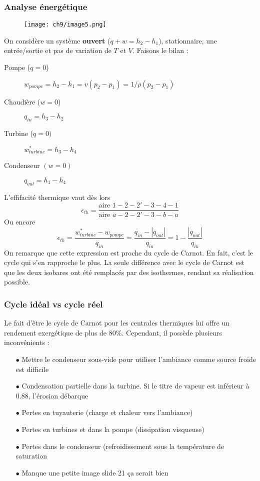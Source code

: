		\subsubsection{Analyse énergétique}
		\begin{wrapfigure}[8]{r}{4cm}
		\vspace{-5mm}
		\texttt{[image: ch9/image5.png]}
		\end{wrapfigure}
		On considère un système \textbf{ouvert} ($q+w = h_2-h_1$), stationnaire, 
		une entrée/sortie et pas de variation de $T$ et $V$. Faisons le bilan :
		\begin{description}
		\item[Pompe ($q=0$)] $w_{pompe} = h_2-h_1 = v(p_2-p_1)=1/\rho(p_2-p_1)$
		\item[Chaudière ($w=0$)] $q_{in} = h_3-h_2$
		\item[Turbine ($q=0)$] $w_{turbine}^* = h_3-h_4$
		\item[Condenseur $(w=0)$] $q_{out} = h_1-h_4$
		\end{description}
		L'effifacité thermique vaut dès lors 
		\begin{equation}
		\epsilon_{th} = \dfrac{\text{aire } 1-2-2'-3-4-1}{\text{aire } a-2-2'-3-b-a}
		\end{equation}
		Ou encore 
		\begin{equation}
		\epsilon_{th} = \dfrac{w_{turbine}^*-w_{pompe}}{q_{in}} = \dfrac{q_{in}-|q_{out}|}{
		q_{in}} = 1-\dfrac{|q_{out}|}{q_{in}}
		\end{equation}
		On remarque que cette expression est proche du cycle de Carnot. En fait, c'est 
		le cycle qui s'en rapproche le plus. La seule différence avec le cycle de Carnot 
		est que les deux isobares ont été remplacés par des isothermes, rendant sa 
		réalisation possible. 
		
		\newpage
		\subsubsection{Cycle idéal vs cycle réel}
		Le fait d’être le cycle de Carnot pour les centrales thermiques lui offre un 
		rendement exergétique de plus de 80\%. Cependant, il possède plusieurs 
		inconvénients :
		\begin{itemize}
		\item[$\bullet$] Mettre le condenseur sous-vide pour utiliser l'ambiance 
		comme source froide est difficile
		\item[$\bullet$] Condensation partielle dans la turbine. Si le titre de 
		vapeur est inférieur à 0.88, l’érosion débarque
		\item[$\bullet$] Pertes en tuyauterie (charge et chaleur vers l'ambiance)
		\item[$\bullet$] Pertes en turbines et dans la pompe (dissipation visqueuse)
		\item[$\bullet$] Pertes dans le condenseur (refroidissement sous la température de saturation
		\item[$\bullet$] Manque une petite image slide 21 ça serait bien
		\end{itemize}
	

